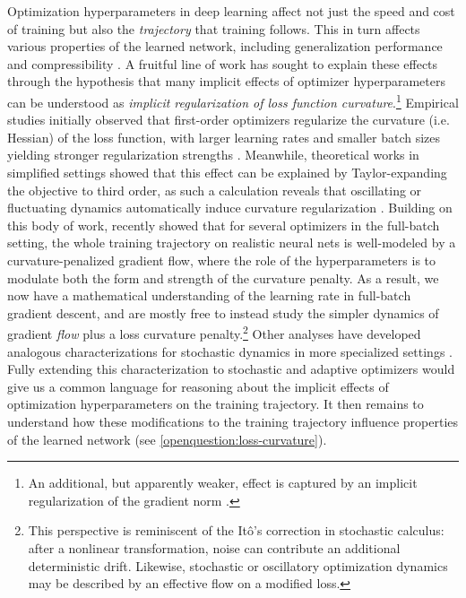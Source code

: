 Optimization hyperparameters in deep learning affect not just the speed and cost of training but also the \textit{trajectory} that training follows.
This in turn affects various properties of the learned network, including generalization performance \citep{keskar2016large,schulman2025lora} and compressibility \citep{catalan2025training, barsbey2025large}.
A fruitful line of work has sought to explain these effects through the hypothesis that many implicit effects of optimizer hyperparameters can be understood as \emph{implicit regularization of loss function curvature}.\footnote{An additional, but apparently weaker, effect is captured by an implicit regularization of the gradient norm \citep{barrett2020implicit, smith2021origin}.}
Empirical studies initially observed that first-order optimizers regularize the curvature (i.e. Hessian) of the loss function, with larger learning rates and smaller batch sizes yielding stronger regularization strengths \citep{keskar2016large, jastrzkebski2017three, jastrzebski2020break, cohen2021gradient}.
Meanwhile, theoretical works in simplified settings showed that this effect can be explained by Taylor-expanding the objective to third order, as such a calculation reveals that oscillating or fluctuating dynamics automatically induce curvature regularization \citep{blanc2020implicit,li2021happens,damian2021label,wen2022does,li2025adam}.
Building on this body of work, \citet{centralflows} recently showed that for several optimizers in the full-batch setting, the whole training trajectory on realistic neural nets is well-modeled by a curvature-penalized gradient flow, where the role of the hyperparameters is to modulate both the form and strength of the curvature penalty.
As a result, we now have a mathematical understanding of the learning rate in full-batch gradient descent, and are mostly free to instead study the simpler dynamics of gradient \textit{flow} plus a loss curvature penalty.\footnote{This perspective is reminiscent of the It\^{o}'s correction in stochastic calculus: after a nonlinear transformation, noise can contribute an additional deterministic drift. Likewise, stochastic or oscillatory optimization dynamics may be described by an effective flow on a modified loss.}
Other analyses have developed analogous characterizations for stochastic dynamics in more specialized settings \citep{pesme2021implicit, chen2024stochastic}.
Fully extending this characterization to stochastic and adaptive optimizers would give us a common language for reasoning about the implicit effects of optimization hyperparameters on the training trajectory.
It then remains to understand how these modifications to the training trajectory influence properties of the learned network (see \cref{openquestion:loss-curvature}).



